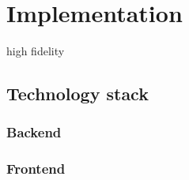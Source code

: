 \section{Implementation}


high fidelity

    \subsection{Technology stack}

        \subsubsection{Backend}

        \subsubsection{Frontend}



